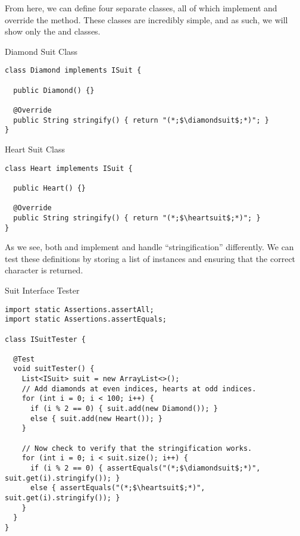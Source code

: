 From here, we can define four separate classes, all of which implement  and override the  method. These classes are incredibly simple, and as such, we will show only the  and  classes.

\begin{cl}{Diamond Suit Class}
\begin{lstlisting}[language=MyJava]
class Diamond implements ISuit {
  
  public Diamond() {}

  @Override
  public String stringify() { return "(*;$\diamondsuit$;*)"; }
}
\end{lstlisting}
\end{cl}

\begin{cl}{Heart Suit Class}
\begin{lstlisting}[language=MyJava]
class Heart implements ISuit {
    
  public Heart() {}

  @Override
  public String stringify() { return "(*;$\heartsuit$;*)"; }
}
\end{lstlisting}
\end{cl}

As we see, both  and  implement  and handle ``stringification'' differently. We can test these definitions by storing a list of  instances and ensuring that the correct character is returned.

\begin{cl}{Suit Interface Tester}
\begin{lstlisting}[language=MyJava]
import static Assertions.assertAll;
import static Assertions.assertEquals;

class ISuitTester {

  @Test
  void suitTester() {
    List<ISuit> suit = new ArrayList<>();
    // Add diamonds at even indices, hearts at odd indices.
    for (int i = 0; i < 100; i++) {
      if (i % 2 == 0) { suit.add(new Diamond()); }
      else { suit.add(new Heart()); }
    }

    // Now check to verify that the stringification works.
    for (int i = 0; i < suit.size(); i++) {
      if (i % 2 == 0) { assertEquals("(*;$\diamondsuit$;*)", suit.get(i).stringify()); }
      else { assertEquals("(*;$\heartsuit$;*)", suit.get(i).stringify()); }
    }
  }
}
\end{lstlisting}
\end{cl}

